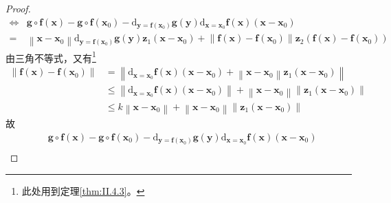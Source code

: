 \documentclass[main.tex]{subfiles}
\begin{document}
\begin{proof}
\begin{align*}
        \Leftrightarrow & \mathbf{g}\circ\mathbf{f}\left(\mathbf{x}\right)-\mathbf{g}\circ\mathbf{f}\left(\mathbf{x}_0\right)-\mathrm{d}_{\mathbf{y}=\mathbf{f}\left(\mathbf{x}_0\right)}\mathbf{g}\left(\mathbf{y}\right)\mathrm{d}_{\mathbf{x}=\mathbf{x}_0}\mathbf{f}\left(\mathbf{x}\right)\left(\mathbf{x}-\mathbf{x}_0\right)                                                                                                     \\
        =               & \left\|\mathbf{x}-\mathbf{x}_0\right\|\mathrm{d}_{\mathbf{y}=\mathbf{f}\left(\mathbf{x}_0\right)}\mathbf{g}\left(\mathbf{y}\right)\mathbf{z}_1\left(\mathbf{x}-\mathbf{x}_0\right)+\left\|\mathbf{f}\left(\mathbf{x}\right)-\mathbf{f}\left(\mathbf{x}_0\right)\right\|\mathbf{z}_2\left(\mathbf{f}\left(\mathbf{x}\right)-\mathbf{f}\left(\mathbf{x}_0\right)\right)
    \end{align*}
    由三角不等式，又有\footnote{
        此处用到定理\ref{thm:II.4.3}。
    }
    \begin{align*}
        \left\|\mathbf{f}\left(\mathbf{x}\right)-\mathbf{f}\left(\mathbf{x}_0\right)\right\| & =\left\|\mathrm{d}_{\mathbf{x}=\mathbf{x}_0}\mathbf{f}\left(\mathbf{x}\right)\left(\mathbf{x}-\mathbf{x}_0\right)+\left\|\mathbf{x}-\mathbf{x}_0\right\|\mathbf{z}_1\left(\mathbf{x}-\mathbf{x}_0\right)\right\|                    \\
                                                                                             & \leq \left\|\mathrm{d}_{\mathbf{x}=\mathbf{x}_0}\mathbf{f}\left(\mathbf{x}\right)\left(\mathbf{x}-\mathbf{x}_0\right)\right\|+\left\|\mathbf{x}-\mathbf{x}_0\right\|\left\|\mathbf{z}_1\left(\mathbf{x}-\mathbf{x}_0\right)\right\| \\
                                                                                             & \leq k\left\|\mathbf{x}-\mathbf{x}_0\right\|+\left\|\mathbf{x}-\mathbf{x}_0\right\|\left\|\mathbf{z}_1\left(\mathbf{x}-\mathbf{x}_0\right)\right\|
    \end{align*}
    故
    \begin{align*}
             & \mathbf{g}\circ\mathbf{f}\left(\mathbf{x}\right)-\mathbf{g}\circ\mathbf{f}\left(\mathbf{x}_0\right)-\mathrm{d}_{\mathbf{y}=\mathbf{f}\left(\mathbf{x}_0\right)}\mathbf{g}\left(\mathbf{y}\right)\mathrm{d}_{\mathbf{x}=\mathbf{x}_0}\mathbf{f}\left(\mathbf{x}\right)\left(\mathbf{x}-\mathbf{x}_0\right)                                                                                                                                   \\

\end{align*}
\end{proof}
\end{document}
